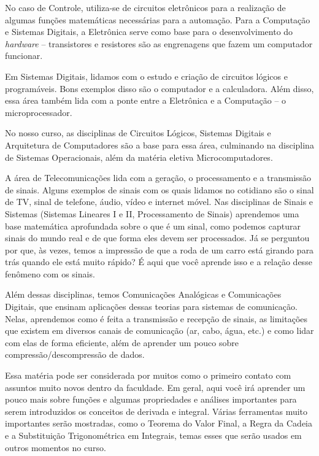             No caso de Controle, utiliza-se de circuitos eletrônicos para a realização de algumas funções matemáticas necessárias para a automação. Para a Computação e Sistemas Digitais, a Eletrônica serve como base para o desenvolvimento do \textit{hardware} -- transistores e resistores são as engrenagens que fazem um computador funcionar.
            
        	Em Sistemas Digitais, lidamos com o estudo e criação de circuitos lógicos e programáveis. Bons exemplos disso são o computador e a calculadora. Além disso, essa área também lida com a ponte entre a Eletrônica e a Computação -- o microprocessador. 
            
            No nosso curso, as disciplinas de Circuitos Lógicos, Sistemas Digitais e Arquitetura de Computadores são a base para essa área, culminando na disciplina de Sistemas Operacionais, além da matéria eletiva Microcomputadores.
            
        	A área de Telecomunicações lida com a geração, o processamento e a transmissão de sinais. Alguns exemplos de sinais com os quais lidamos no cotidiano são o sinal de TV, sinal de telefone, áudio, vídeo e internet móvel. Nas disciplinas de Sinais e Sistemas (Sistemas Lineares I e II, Processamento de Sinais) aprendemos uma base matemática aprofundada sobre o que é um sinal, como podemos capturar sinais do mundo real e de que forma eles devem ser processados. Já se perguntou por que, às vezes, temos a impressão de que a roda de um carro está girando para trás quando ele está muito rápido? É aqui que você aprende isso e a relação desse fenômeno com os sinais. 
          
            Além dessas disciplinas, temos Comunicações Analógicas e Comunicações Digitais, que ensinam aplicações dessas teorias para sistemas de comunicação. Nelas, aprendemos como é feita a transmissão e recepção de sinais, as limitações que existem em diversos canais de comunicação (ar, cabo, água, etc.) e como lidar com elas de forma eficiente, além de aprender um pouco sobre compressão/descompressão de dados.
            
        
        	Essa matéria pode ser considerada por muitos como o primeiro contato com assuntos muito novos dentro da faculdade. Em geral, aqui você irá aprender um pouco mais sobre funções e algumas propriedades e análises importantes para serem introduzidos os conceitos de derivada e integral. Várias ferramentas muito importantes serão mostradas, como o Teorema do Valor Final, a Regra da Cadeia e a Substituição Trigonométrica em Integrais, temas esses que serão usados em outros momentos no curso.
            
